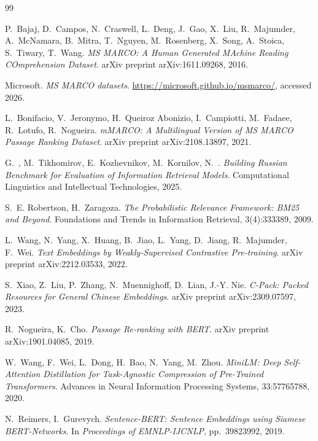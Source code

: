 \documentclass[runningheads,a4paper]{llncs}
\begin{document}
\begin{thebibliography}{99}

P.~Bajaj, D.~Campos, N.~Craswell, L.~Deng, J.~Gao, X.~Liu, R.~Majumder, A.~McNamara, B.~Mitra, T.~Nguyen, M.~Rosenberg, X.~Song, A.~Stoica, S.~Tiwary, T.~Wang.
\newblock \textit{MS MARCO: A Human Generated MAchine Reading COmprehension Dataset}.
\newblock arXiv preprint arXiv:1611.09268, 2016.

Microsoft.
\newblock \textit{MS MARCO datasets}.
\newblock \url{https://microsoft.github.io/msmarco/}, accessed 2026.

L.~Bonifacio, V.~Jeronymo, H.~Queiroz Abonizio, I.~Campiotti, M.~Fadaee, R.~Lotufo, R.~Nogueira.
\newblock \textit{mMARCO: A Multilingual Version of MS MARCO Passage Ranking Dataset}.
\newblock arXiv preprint arXiv:2108.13897, 2021.

G.~, M.~Tikhomirov, E.~Kozhevnikov, M.~Kornilov, N.~.
\newblock \textit{Building Russian Benchmark for Evaluation of Information Retrieval Models}.
\newblock Computational Linguistics and Intellectual Technologies, 2025.

S.~E. Robertson, H.~Zaragoza.
\newblock \textit{The Probabilistic Relevance Framework: BM25 and Beyond}.
\newblock Foundations and Trends in Information Retrieval, 3(4):333\textendash{}389, 2009.

L.~Wang, N.~Yang, X.~Huang, B.~Jiao, L.~Yang, D.~Jiang, R.~Majumder, F.~Wei.
\newblock \textit{Text Embeddings by Weakly-Supervised Contrastive Pre-training}.
\newblock arXiv preprint arXiv:2212.03533, 2022.

S.~Xiao, Z.~Liu, P.~Zhang, N.~Muennighoff, D.~Lian, J.-Y. Nie.
\newblock \textit{C-Pack: Packed Resources for General Chinese Embeddings}.
\newblock arXiv preprint arXiv:2309.07597, 2023.

R.~Nogueira, K.~Cho.
\newblock \textit{Passage Re-ranking with BERT}.
\newblock arXiv preprint arXiv:1901.04085, 2019.

W.~Wang, F.~Wei, L.~Dong, H.~Bao, N.~Yang, M.~Zhou.
\newblock \textit{MiniLM: Deep Self-Attention Distillation for Task-Agnostic Compression of Pre-Trained Transformers}.
\newblock Advances in Neural Information Processing Systems, 33:5776\textendash{}5788, 2020.

N.~Reimers, I.~Gurevych.
\newblock \textit{Sentence-BERT: Sentence Embeddings using Siamese BERT-Networks}.
\newblock In \textit{Proceedings of EMNLP-IJCNLP}, pp.~3982\textendash{}3992, 2019.


\end{thebibliography}
\end{document}
